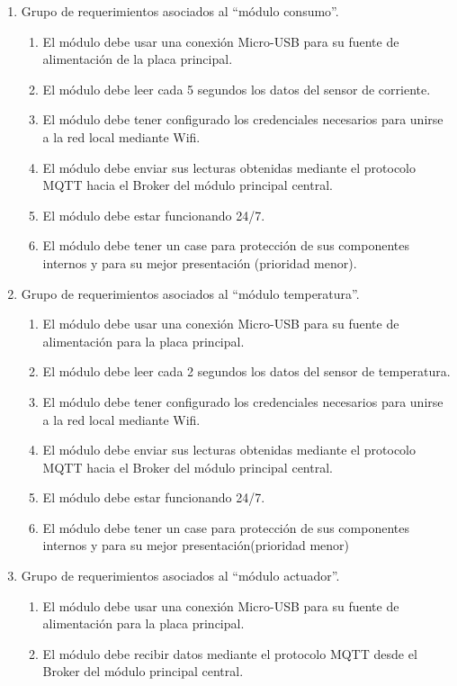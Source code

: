 \documentclass[11pt]{charter}
\begin{document}
\begin{enumerate}
\item Grupo de requerimientos asociados al ``módulo consumo''.
	\begin{enumerate}
	\item El módulo debe usar una conexión Micro-USB para su fuente de alimentación de la placa principal.
	\item El módulo debe leer cada 5 segundos los datos del sensor de corriente.
	\item El módulo debe tener configurado los credenciales necesarios para unirse a la red local mediante Wifi.
	\item El módulo debe enviar sus lecturas obtenidas mediante el protocolo MQTT hacia el Broker del módulo principal central.
	\item El módulo debe estar funcionando 24/7.
	\item El módulo debe tener un case para protección de sus componentes internos y para su mejor presentación (prioridad menor).
	\end{enumerate}	
\item Grupo de requerimientos asociados al ``módulo temperatura''.
	\begin{enumerate}
	\item El módulo debe usar una conexión Micro-USB para su fuente de alimentación para la placa principal.
	\item El módulo debe leer cada 2 segundos los datos del sensor de temperatura.
	\item El módulo debe tener configurado los credenciales necesarios para unirse a la red local mediante Wifi.
	\item El módulo debe enviar sus lecturas obtenidas mediante el protocolo MQTT hacia el Broker del módulo principal central.
	\item El módulo debe estar funcionando 24/7.
	\item El módulo debe tener un case para protección de sus componentes internos y para su mejor presentación(prioridad menor)
	\end{enumerate}	
\item Grupo de requerimientos asociados al ``módulo actuador''.
	\begin{enumerate}
	\item El módulo debe usar una conexión Micro-USB para su fuente de alimentación para la placa principal.
		\item El módulo debe recibir datos mediante el protocolo MQTT desde el Broker del módulo principal central.

\end{enumerate}
\end{enumerate}
\end{document}
